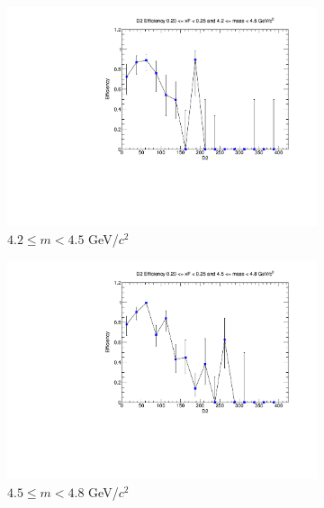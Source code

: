 \begin{figure}[p]
    \centering
    \begin{subfigure}[b]{0.32\textwidth}
        \centering
        \includegraphics[width=\textwidth]{./kTrackerEfficiencyPlots/D2_Efficiency_xF4_mass0.pdf}
        \caption{$4.2 \leq m < 4.5$ GeV/$c^2$}
        \label{fig:xF4_mass0}
    \end{subfigure}
    \hfill
    \begin{subfigure}[b]{0.32\textwidth}
        \centering
        \includegraphics[width=\textwidth]{./kTrackerEfficiencyPlots/D2_Efficiency_xF4_mass1.pdf}
        \caption{$4.5 \leq m < 4.8$ GeV/$c^2$}
        \label{fig:xF4_mass1}
    \end{subfigure}
    \hfill
    \begin{subfigure}[b]{0.32\textwidth}

\end{subfigure}
\end{figure}
